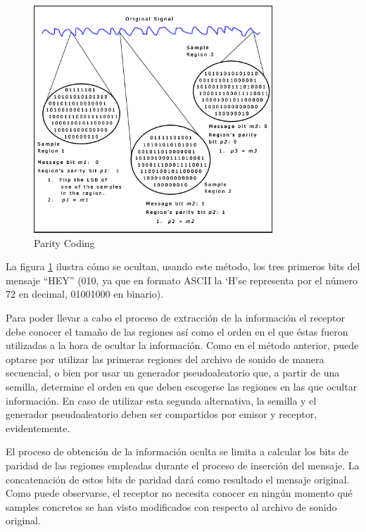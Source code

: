 \documentclass[12pt]{article}
\begin{document}
\begin{figure}
  \centering
    \includegraphics[width=0.8\textwidth]{img/parity}
  \caption{Parity Coding}
  \label{paritycoding}
\end{figure}

La figura \ref{paritycoding} ilustra cómo se ocultan, usando este método, los tres primeros bits del mensaje ``HEY'' (010, ya que en formato ASCII la `H'\space se representa por el número 72 en decimal, 01001000 en binario).

Para poder llevar a cabo el proceso de extracción de la información el receptor debe conocer el tamaño de las regiones así como el orden en el que éstas fueron utilizadas a la hora de ocultar la información. Como en el método anterior, puede optarse por utilizar las primeras regiones del archivo de sonido de manera secuencial, o bien por usar un generador pseudoaleatorio que, a partir de una semilla, determine el orden en que deben escogerse las regiones en las que ocultar información. En caso de utilizar esta segunda alternativa, la semilla y el generador pseudoaleatorio deben ser compartidos por emisor y receptor, evidentemente.

El proceso de obtención de la información oculta se limita a calcular los bits de paridad de las regiones empleadas durante el proceso de inserción del mensaje. La concatenación de estos bits de paridad dará como resultado el mensaje original. Como puede observarse, el receptor no necesita conocer en ningún momento qué samples concretos se han visto modificados con respecto al archivo de sonido original.
\end{document}
